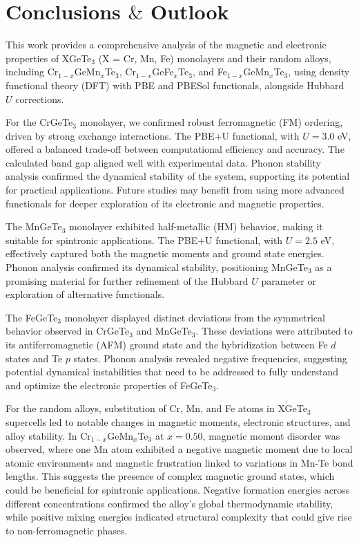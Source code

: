 \chapter{\texorpdfstring{Conclusions $\&$ Outlook}{Conclusions \& Outlook}} %

\label{Chapter5} %


This work provides a comprehensive analysis of the magnetic and electronic properties of XGeTe$_3$ (X = Cr, Mn, Fe) monolayers and their random alloys, including Cr$_{1-x}$GeMn$_{x}$Te$_3$, Cr$_{1-x}$GeFe$_{x}$Te$_3$, and Fe$_{1-x}$GeMn$_{x}$Te$_3$, using density functional theory (DFT) with PBE and PBESol functionals, alongside Hubbard $U$ corrections.

For the CrGeTe$_3$ monolayer, we confirmed robust ferromagnetic (FM) ordering, driven by strong exchange interactions. The PBE+U functional, with $U = 3.0$ eV, offered a balanced trade-off between computational efficiency and accuracy. The calculated band gap aligned well with experimental data. Phonon stability analysis confirmed the dynamical stability of the system, supporting its potential for practical applications. Future studies may benefit from using more advanced functionals for deeper exploration of its electronic and magnetic properties.

The MnGeTe$_3$ monolayer exhibited half-metallic (HM) behavior, making it suitable for spintronic applications. The PBE+U functional, with $U = 2.5$ eV, effectively captured both the magnetic moments and ground state energies. Phonon analysis confirmed its dynamical stability, positioning MnGeTe$_3$ as a promising material for further refinement of the Hubbard $U$ parameter or exploration of alternative functionals.

The FeGeTe$_3$ monolayer displayed distinct deviations from the symmetrical behavior observed in CrGeTe$_3$ and MnGeTe$_3$. These deviations were attributed to its antiferromagnetic (AFM) ground state and the hybridization between Fe $d$ states and Te $p$ states. Phonon analysis revealed negative frequencies, suggesting potential dynamical instabilities that need to be addressed to fully understand and optimize the electronic properties of FeGeTe$_3$.

For the random alloys, substitution of Cr, Mn, and Fe atoms in XGeTe$_3$ supercells led to notable changes in magnetic moments, electronic structures, and alloy stability. In Cr$_{1-x}$GeMn$_{x}$Te$_3$ at $x = 0.50$, magnetic moment disorder was observed, where one Mn atom exhibited a negative magnetic moment due to local atomic environments and magnetic frustration linked to variations in Mn-Te bond lengths. This suggests the presence of complex magnetic ground states, which could be beneficial for spintronic applications. Negative formation energies across different concentrations confirmed the alloy's global thermodynamic stability, while positive mixing energies indicated structural complexity that could give rise to non-ferromagnetic phases.

